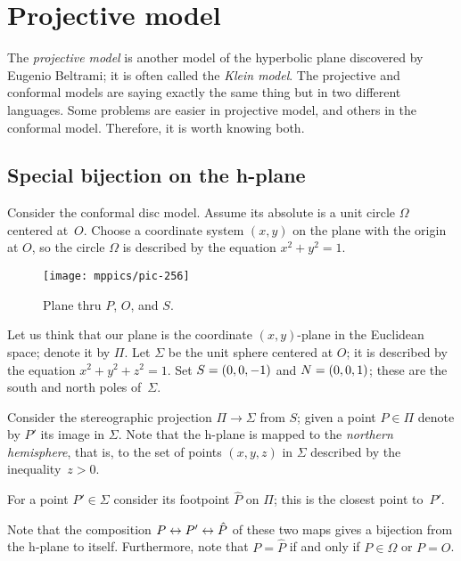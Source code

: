 \chapter{Projective model}\label{chap:klein}

The \textit{projective model} is another model of the hyperbolic plane discovered by Eugenio Beltrami; it is often called the {}\emph{Klein model}.
The projective and conformal models are saying exactly the same thing but in two different languages.
Some problems  are easier in projective model, and others in the conformal model.
Therefore, it is worth knowing both. 

\section{Special bijection on the h-plane}
\label{sec:special-bijection}

Consider the conformal disc model.
Assume its absolute is a unit circle $\Omega$ centered at~$O$.
Choose a coordinate system $(x,y)$ on the plane with the origin at $O$, 
so the circle $\Omega$ is described by the equation $x^2+y^2=1$.


\label{pic:stereographic_projection-klein}
\begin{wrapfigure}{o}{48mm}
\centering
\vskip-3mm
\texttt{[image: mppics/pic-256]}
\caption*{Plane thru $P$, $O$, and $S$.}
\vskip-3mm
\end{wrapfigure}

Let us think that our plane is the coordinate $(x,y)$-plane in the Euclidean space; denote it by $\Pi$.
Let $\Sigma$ be the unit sphere centered at $O$;
it is described by the equation 
$x^2+y^2+z^2=1$.
Set $S=(0,0,-1)$ and $N=(0,0,1)$; 
these are the south and north poles of~$\Sigma$.

Consider the stereographic projection $\Pi\to\Sigma$ from $S$;
given a point $P\in\Pi$ denote by $P'$ its image in $\Sigma$.
Note that the  h-plane is mapped to the {}\emph{northern hemisphere},
that is, to the set of points $(x,y,z)$ in $\Sigma$ described by the inequality~$z>0$.

For a point $P'\in \Sigma$ consider its footpoint $\hat P$
on $\Pi$;
this is the closest point to~$P'$.

Note that the composition $P\leftrightarrow P'\leftrightarrow\hat P$ of these two maps
gives a bijection from the h-plane to itself.
Furthermore, note that $P=\hat P$
 if and only if  $P\in \Omega$ or $P=O$.


